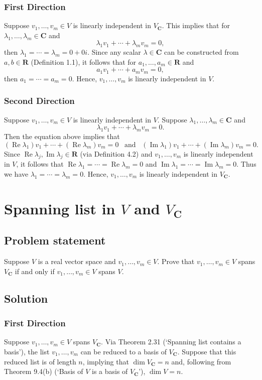 \documentclass{article}
\begin{document}
\subsubsection*{First Direction}
Suppose $v_1,\ldots,v_m\in V$ is linearly independent in $V_{\mathbf{C}}$. 
This implies that for $\lambda_1,\ldots,\lambda_m\in\mathbf{C}$ and 
\[\lambda_1v_1+\cdots+\lambda_mv_m=0,\]
then $\lambda_1=\cdots=\lambda_m=0+0i$. 
Since any scalar $\lambda\in\mathbf{C}$ can be constructed from $a,b\in\mathbf{R}$ (Definition 1.1), it follows that for $a_1,\ldots,a_m\in\mathbf{R}$ and
\[a_1v_1+\cdots+a_mv_m=0,\]
then $a_1=\cdots=a_m=0$. 
Hence, $v_1,\ldots,v_m$ is linearly independent in $V$.

\subsubsection*{Second Direction}
Suppose $v_1,\ldots,v_m\in V$ is linearly independent in $V$. 
Suppose $\lambda_1,\ldots,\lambda_m\in\mathbf{C}$ and 
\[\lambda_1v_1+\cdots+\lambda_mv_m=0.\]
Then the equation above implies that
\[(\operatorname{Re}\lambda_1)v_1+\cdots+(\operatorname{Re}\lambda_m)v_m=0\;\;\;\text{and}\;\;\;(\operatorname{Im}\lambda_1)v_1+\cdots+(\operatorname{Im}\lambda_m)v_m=0.\]
Since $\operatorname{Re}\lambda_j,\operatorname{Im}\lambda_j\in\mathbf{R}$ (via Definition 4.2) and $v_1,\ldots,v_m$ is linearly independent in $V$, it follows that $\operatorname{Re}\lambda_1=\cdots=\operatorname{Re}\lambda_m=0$ and $\operatorname{Im}\lambda_1=\cdots=\operatorname{Im}\lambda_m=0$. 
Thus we have $\lambda_1=\cdots=\lambda_m=0$. 
Hence, $v_1,\ldots,v_m$ is linearly independent in $V_{\mathbf{C}}$.


\clearpage

\section{Spanning list in $V$ and $V_{\mathbf{C}}$}
\subsection*{Problem statement}
Suppose $V$ is a real vector space and $v_1,\ldots,v_m\in V$. 
Prove that $v_1,\ldots,v_m\in V$ spans $V_{\mathbf{C}}$ if and only if $v_1,\ldots,v_m\in V$ spans $V$.

\subsection*{Solution}
\subsubsection*{First Direction}
Suppose $v_1,\ldots,v_m\in V$ spans $V_{\mathbf{C}}$. 
Via Theorem 2.31 (`Spanning list contains a basis'), the list $v_1,\ldots,v_m$ can be reduced to a basis of $V_{\mathbf{C}}$. 
Suppose that this reduced list is of length $n$, implying that $\operatorname{dim}V_{\mathbf{C}}=n$ and, following from Theorem 9.4(b) (`Basis of $V$ is a basis of $V_{\mathbf{C}}$'), $\operatorname{dim}V=n$.
\end{document}
